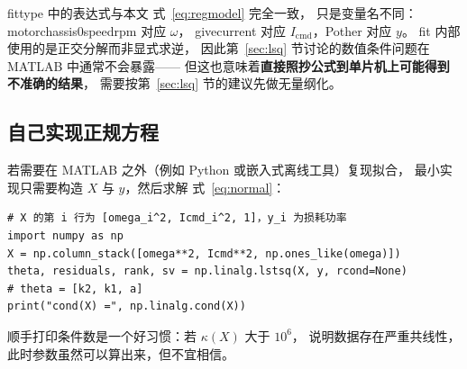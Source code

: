 \documentclass[cn,blue,11pt,device=normal]{elegantnote}
\newcommand{\code}[1]{{\ttfamily\small\def\_{\textunderscore\allowbreak}#1}}
\newcommand{\Icmd}{I_{\mathrm{cmd}}{}}
\newcommand{\fref}[1]{式~\eqref{#1}}
\begin{document}
\code{fittype} 中的表达式与本文 \fref{eq:regmodel} 完全一致，
只是变量名不同：\code{motor\_chassis0speed\_rpm} 对应 $\omega$，
\code{give\_current} 对应 $\Icmd$，\code{Pother} 对应 $y$。
\code{fit} 内部使用的是正交分解而非显式求逆，
因此第~\ref{sec:lsq} 节讨论的数值条件问题在 MATLAB 中通常不会暴露——
但这也意味着\textbf{直接照抄公式到单片机上可能得到不准确的结果}，
需要按第~\ref{sec:lsq} 节的建议先做无量纲化。

\subsection{自己实现正规方程}

若需要在 MATLAB 之外（例如 Python 或嵌入式离线工具）复现拟合，
最小实现只需要构造 $X$ 与 $y$，然后求解 \fref{eq:normal}：

\begin{lstlisting}[style=cstyle, numbers=none]
# X 的第 i 行为 [omega_i^2, Icmd_i^2, 1]，y_i 为损耗功率
import numpy as np
X = np.column_stack([omega**2, Icmd**2, np.ones_like(omega)])
theta, residuals, rank, sv = np.linalg.lstsq(X, y, rcond=None)
# theta = [k2, k1, a]
print("cond(X) =", np.linalg.cond(X))
\end{lstlisting}

顺手打印条件数是一个好习惯：若 $\kappa(X)$ 大于 $10^{6}$，
说明数据存在严重共线性，此时参数虽然可以算出来，但不宜相信。

\end{document}

